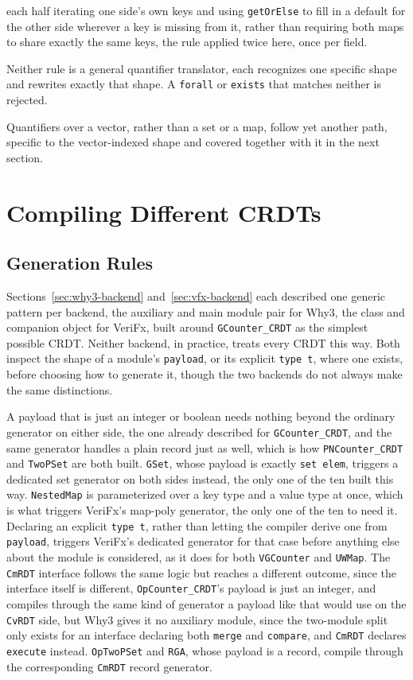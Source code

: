each half iterating one side's own keys and using \texttt{getOrElse} to fill in a default for the other side wherever a
key is missing from it, rather than requiring both maps to share exactly the same keys, the rule applied twice here,
once per field.

Neither rule is a general quantifier translator, each recognizes one specific shape and rewrites exactly that shape. A
\texttt{forall} or \texttt{exists} that matches neither is rejected.

Quantifiers over a vector, rather than a set or a map, follow yet another path, specific to the vector-indexed shape and
covered together with it in the next section.

\section{Compiling Different CRDTs}
\label{sec:crdt-shapes}

\subsection{Generation Rules}
\label{sub:generation-rules}

Sections~\ref{sec:why3-backend} and~\ref{sec:vfx-backend} each described one generic pattern per backend, the auxiliary
and main module pair for Why3, the class and companion object for VeriFx, built around \texttt{GCounter\_CRDT} as the
simplest possible CRDT. Neither backend, in practice, treats every CRDT this way. Both inspect the shape of a module's
\texttt{payload}, or its explicit \texttt{type t}, where one exists, before choosing how to generate it, though the two
backends do not always make the same distinctions.

A payload that is just an integer or boolean needs nothing beyond the ordinary generator on either side, the one already
described for \texttt{GCounter\_CRDT}, and the same generator handles a plain record just as well, which is how
\texttt{PNCounter\_CRDT} and \texttt{TwoPSet} are both built. \texttt{GSet}, whose payload is exactly \texttt{set elem},
triggers a dedicated set generator on both sides instead, the only one of the ten built this way. \texttt{NestedMap} is
parameterized over a key type and a value type at once, which is what triggers VeriFx's map-poly generator, the only one
of the ten to need it. Declaring an explicit \texttt{type t}, rather than letting the compiler derive one from
\texttt{payload}, triggers VeriFx's dedicated generator for that case before anything else about the module is considered,
as it does for both \texttt{VGCounter} and \texttt{UWMap}. The \texttt{CmRDT} interface follows the same logic but reaches
a different outcome, since the interface itself is different, \texttt{OpCounter\_CRDT}'s payload is just an integer, and
compiles through the same kind of generator a payload like that would use on the \texttt{CvRDT} side, but Why3 gives it
no auxiliary module, since the two-module split only exists for an interface declaring both \texttt{merge} and
\texttt{compare}, and \texttt{CmRDT} declares \texttt{execute} instead. \texttt{OpTwoPSet} and \texttt{RGA}, whose
payload is a record, compile through the corresponding \texttt{CmRDT} record generator.

